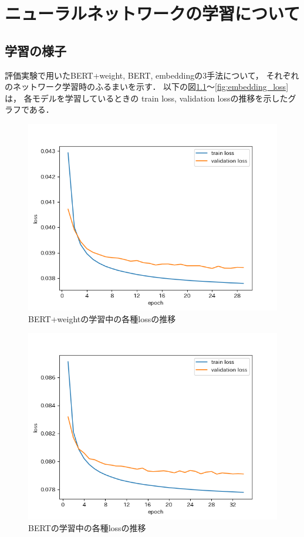 \chapter{ニューラルネットワークの学習について}

\section{学習の様子}
	評価実験で用いたBERT+weight, BERT, embeddingの3手法について，
	それぞれのネットワーク学習時のふるまいを示す．
	以下の図\ref{fig:BERT_plus_weight_loss}～\ref{fig:embedding_loss}は，
	各モデルを学習しているときの
	train loss, validation lossの推移を示したグラフである．

	\begin{figure}[H]
		\centering
		\includegraphics[keepaspectratio, scale=0.8]{./figure/BERT+weight.png}
		\caption{BERT+weightの学習中の各種lossの推移}
		\label{fig:BERT_plus_weight_loss}
	\end{figure}

	\begin{figure}[H]
		\centering
		\includegraphics[keepaspectratio, scale=0.8]{./figure/BERT.png}
		\caption{BERTの学習中の各種lossの推移}
		\label{fig:BERT_loss}
	\end{figure}

